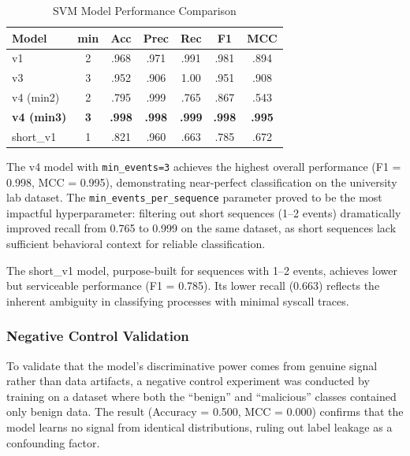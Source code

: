 \documentclass[journal]{./IEEEtran}
\begin{document}
\begin{table}[H]
    \centering
    \footnotesize
    \setlength{\tabcolsep}{3pt}
    \renewcommand{\arraystretch}{1.1}
    \caption{SVM Model Performance Comparison}
    \begin{tabular}{|l|c|c|c|c|c|c|}
        \hline
        \textbf{Model} & \textbf{min} & \textbf{Acc} & \textbf{Prec} & \textbf{Rec} & \textbf{F1} & \textbf{MCC} \\ \hline
        v1             & 2   & .968 & .971 & .991 & .981 & .894 \\ \hline
        v3             & 3   & .952 & .906 & 1.00 & .951 & .908 \\ \hline
        v4 (min2)      & 2   & .795 & .999 & .765 & .867 & .543 \\ \hline
        \textbf{v4 (min3)} & \textbf{3} & \textbf{.998} & \textbf{.998} & \textbf{.999} & \textbf{.998} & \textbf{.995} \\ \hline
        short\_v1      & 1   & .821 & .960 & .663 & .785 & .672 \\ \hline
    \end{tabular}
    \label{tab:model_comparison}
\end{table}

The v4 model with \texttt{min\_events=3} achieves the highest overall performance (F1 = 0.998, MCC = 0.995), demonstrating near-perfect classification on the university lab dataset. The \texttt{min\_events\_per\_sequence} parameter proved to be the most impactful hyperparameter: filtering out short sequences (1--2 events) dramatically improved recall from 0.765 to 0.999 on the same dataset, as short sequences lack sufficient behavioral context for reliable classification.

The short\_v1 model, purpose-built for sequences with 1--2 events, achieves lower but serviceable performance (F1 = 0.785). Its lower recall (0.663) reflects the inherent ambiguity in classifying processes with minimal syscall traces.

\subsubsection{Negative Control Validation}
To validate that the model's discriminative power comes from genuine signal rather than data artifacts, a negative control experiment was conducted by training on a dataset where both the ``benign'' and ``malicious'' classes contained only benign data. The result (Accuracy = 0.500, MCC = 0.000) confirms that the model learns no signal from identical distributions, ruling out label leakage as a confounding factor.
\end{document}
